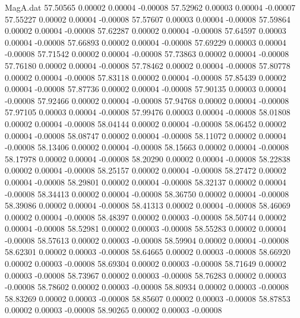 \begin{filecontents}{MagA.dat}
  57.50565    0.00002    0.00004   -0.00008
  57.52962    0.00003    0.00004   -0.00007
  57.55227    0.00002    0.00004   -0.00008
  57.57607    0.00003    0.00004   -0.00008
  57.59864    0.00002    0.00004   -0.00008
  57.62287    0.00002    0.00004   -0.00008
  57.64597    0.00003    0.00004   -0.00008
  57.66893    0.00002    0.00004   -0.00008
  57.69229    0.00003    0.00004   -0.00008
  57.71542    0.00002    0.00004   -0.00008
  57.73863    0.00002    0.00004   -0.00008
  57.76180    0.00002    0.00004   -0.00008
  57.78462    0.00002    0.00004   -0.00008
  57.80778    0.00002    0.00004   -0.00008
  57.83118    0.00002    0.00004   -0.00008
  57.85439    0.00002    0.00004   -0.00008
  57.87736    0.00002    0.00004   -0.00008
  57.90135    0.00003    0.00004   -0.00008
  57.92466    0.00002    0.00004   -0.00008
  57.94768    0.00002    0.00004   -0.00008
  57.97105    0.00003    0.00004   -0.00008
  57.99476    0.00003    0.00004   -0.00008
  58.01808    0.00002    0.00004   -0.00008
  58.04144    0.00002    0.00004   -0.00008
  58.06452    0.00002    0.00004   -0.00008
  58.08747    0.00002    0.00004   -0.00008
  58.11072    0.00002    0.00004   -0.00008
  58.13406    0.00002    0.00004   -0.00008
  58.15663    0.00002    0.00004   -0.00008
  58.17978    0.00002    0.00004   -0.00008
  58.20290    0.00002    0.00004   -0.00008
  58.22838    0.00002    0.00004   -0.00008
  58.25157    0.00002    0.00004   -0.00008
  58.27472    0.00002    0.00004   -0.00008
  58.29801    0.00002    0.00004   -0.00008
  58.32137    0.00002    0.00004   -0.00008
  58.34413    0.00002    0.00004   -0.00008
  58.36750    0.00002    0.00004   -0.00008
  58.39086    0.00002    0.00004   -0.00008
  58.41313    0.00002    0.00004   -0.00008
  58.46069    0.00002    0.00004   -0.00008
  58.48397    0.00002    0.00003   -0.00008
  58.50744    0.00002    0.00004   -0.00008
  58.52981    0.00002    0.00003   -0.00008
  58.55283    0.00002    0.00004   -0.00008
  58.57613    0.00002    0.00003   -0.00008
  58.59904    0.00002    0.00004   -0.00008
  58.62301    0.00002    0.00003   -0.00008
  58.64665    0.00002    0.00003   -0.00008
  58.66920    0.00002    0.00003   -0.00008
  58.69304    0.00002    0.00003   -0.00008
  58.71649    0.00002    0.00003   -0.00008
  58.73967    0.00002    0.00003   -0.00008
  58.76283    0.00002    0.00003   -0.00008
  58.78602    0.00002    0.00003   -0.00008
  58.80934    0.00002    0.00003   -0.00008
  58.83269    0.00002    0.00003   -0.00008
  58.85607    0.00002    0.00003   -0.00008
  58.87853    0.00002    0.00003   -0.00008
  58.90265    0.00002    0.00003   -0.00008

\end{filecontents}
